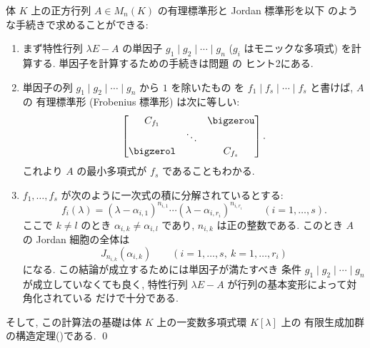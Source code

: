 \documentclass[12pt,twoside]{jarticle}
\begin{document}
\begin{summary}[単因子に基いた行列の標準形の計算の仕方]
\label{q:summary-elem-div-normal-form}
  体 $K$ 上の正方行列 $A\in M_n(K)$ の有理標準形と Jordan 標準形を以下
  のような手続きで求めることができる:
  \begin{enumerate}
  \item まず特性行列 $\lambda E - A$ の単因子 $g_1\mid g_2\mid\cdots\mid g_n$ 
    ($g_i$ はモニックな多項式) を計算する. 
    単因子を計算するための手続きは問題  の
    ヒント2にある. 
  \item 単因子の列 $g_1\mid g_2\mid\cdots\mid g_n$ から $1$ を除いたもの
    を $f_1\mid f_s\mid\cdots\mid f_s$ と書けば, $A$ の
    有理標準形 (Frobenius 標準形) は次に等しい:
    \begin{equation*}
      \begin{bmatrix}
        C_{f_1} &        & \bigzerou \\
                & \ddots & \\
        \bigzerol &      & C_{f_s} \\
      \end{bmatrix}.
    \end{equation*}
    これより $A$ の最小多項式が $f_s$ であることもわかる.
  \item $f_1,\dots,f_s$ が次のように一次式の積に分解されているとする:
    \begin{equation*}
      f_i(\lambda) = 
      (\lambda-\alpha_{i,1})^{n_{i,1}}
      \cdots
      (\lambda-\alpha_{i,r_i})^{n_{i,r_i}}
      \qquad (i=1,\dots,s).
    \end{equation*}
    ここで $k\ne l$ のとき $\alpha_{i,k}\ne\alpha_{i,l}$ であり,
    $n_{i,k}$ は正の整数である. 
    このとき $A$ の Jordan 細胞の全体は 
    \begin{equation*}
      J_{n_{i,k}}(\alpha_{i,k})
      \qquad
      (i=1,\dots,s,\ k=1,\dots,r_i)
    \end{equation*}
    になる. この結論が成立するためには単因子が満たすべき
    条件 $g_1\mid g_2\mid\cdots\mid g_n$ が成立していなくても良く,
    特性行列 $\lambda E - A$ が行列の基本変形によって対角化されている
    だけで十分である.
  \end{enumerate}
  そして, この計算法の基礎は体 $K$ 上の一変数多項式環 $K[\lambda]$ 上の
  有限生成加群の構造定理()である.
  \qed
\end{summary}

\end{document}
